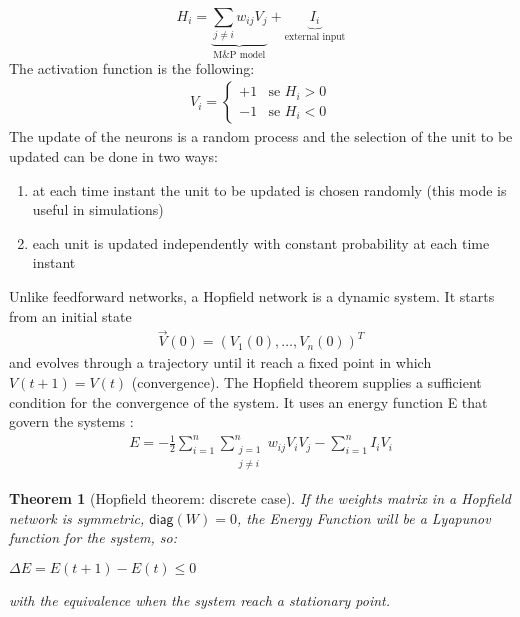 \documentclass[letterpaper,twocolumn,10pt]{article}
\newtheorem{theorem}{Theorem}[section]
\begin{document}
\begin{displaymath}
	H_i = \underbrace{\sum_{j \neq i} w_{ij} V_j}_\textrm{M\&P model} + \underbrace{I_i}_\textrm{external input}
\end{displaymath}
The activation function is the following:
\begin{align}
	V_i = \begin{cases}
		+1 & \text{se } H_i > 0 \\
		-1 & \text{se } H_i < 0
	\end{cases}\label{eq:learningrule}
\end{align}
The update of the neurons is a random process and the selection of the unit to be updated can be done in two ways:
\begin{enumerate}
\item at each time instant the unit to be updated is chosen randomly (this mode is useful in simulations)
\item each unit is updated independently with constant probability at each time instant
\end{enumerate}
Unlike feedforward networks, a Hopfield network is a dynamic system. It starts from an initial state
\begin{align*}
	\vec{V}(0) = (V_1(0), \dots, V_n(0))^T
\end{align*}
and evolves through a trajectory until it reach a fixed point in which $V(t+1)=V(t)$ (convergence). The Hopfield theorem supplies a sufficient condition for the convergence of the system. It uses an energy function E that govern the systems :
\begin{align}
	E = - \frac{1}{2} \sum_{i=1}^n \sum_{\substack{j=1 \\ j \neq i}}^n w_{ij} V_i V_j - \sum_{i=1}^n I_i V_i\label{eq:energy}
\end{align} 
\begin{theorem}[Hopfield theorem: discrete case]
If the weights matrix in a Hopfield network is symmetric, $\textsf{diag}(W)=0$, the Energy Function will be a Lyapunov function for the system, so: 
\begin{center}
$\Delta E = E(t+1)-E(t)\leq 0$
\end{center}
with the equivalence when the system reach a stationary point.
\end{theorem}
\end{document}

